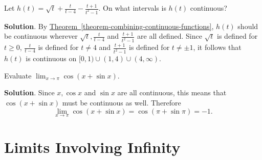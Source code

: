 \documentclass[10pt,]{book}
\theoremstyle{ptxplainnotitle}
\theoremstyle{ptxplaintitle}
\theoremstyle{ptxplainnotitle}
\theoremstyle{ptxplaintitle}
\theoremstyle{ptxplainnotitle}
\theoremstyle{ptxplaintitle}
\theoremstyle{ptxdefinitionnotitle}
\theoremstyle{ptxdefinitiontitle}
\theoremstyle{ptxdefinitionnotitle}
\theoremstyle{ptxdefinitiontitle}
\theoremstyle{ptxdefinitionnotitle}
\theoremstyle{ptxdefinitiontitle}
\theoremstyle{ptxdefinitionnotitle}
\theoremstyle{ptxdefinitiontitle}
\theoremstyle{ptxdefinitionnotitle}
\theoremstyle{ptxdefinitiontitle}
\numberwithin{equation}{section}
\begin{document}
\begin{example}\label{example-determining-where-functions-are-continuous}
\hypertarget{p-48}{}%
Let \(h(t) = \sqrt{t} + \frac{t}{t-4} - \frac{t+1}{t^{2}-1}\). On what intervals is \(h(t)\) continuous?%
\par\smallskip%
\noindent\textbf{Solution}.\hypertarget{solution-9}{}\quad%
\hypertarget{p-49}{}%
By \hyperref[theorem-combining-continuous-functions]{Theorem~\ref{theorem-combining-continuous-functions}}, \(h(t)\) should be continuous wherever \(\sqrt{t}, \frac{t}{t-4}\) and \(\frac{t+1}{t^{2}-1}\) are all defined. Since \(\sqrt{t}\) is defined for \(t\geq0\), \(\frac{t}{t-4}\) is defined for \(t\neq4\) and \(\frac{t+1}{t^{2}-1}\) is defined for \(t\neq\pm1\), it follows that \(h(t)\) is continuous on \([0,1)\cup(1,4)\cup(4,\infty)\).%
\end{example}
\begin{example}\label{example-using-continuity-to-evaluate-a-limit}
\hypertarget{p-50}{}%
Evaluate \(\lim_{x\to\pi}\cos(x+\sin x)\).%
\par\smallskip%
\noindent\textbf{Solution}.\hypertarget{solution-10}{}\quad%
\hypertarget{p-51}{}%
Since \(x, \cos x\) and \(\sin x\) are all continuous, this means that \(\cos(x+\sin x)\) must be continuous as well. Therefore%
\begin{equation*}
\lim_{x\to\pi}\cos(x+\sin x) = \cos(\pi+\sin\pi) = -1.
\end{equation*}
%
\end{example}
\typeout{************************************************}
\typeout{************************************************}
\section[{Limits Involving Infinity}]{Limits Involving Infinity}\label{section-limits-involving-infinity}
\typeout{************************************************}
\typeout{************************************************}
\end{document}
